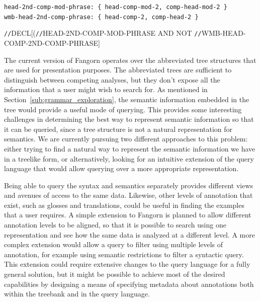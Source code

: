 \documentclass[12pt]{article}
\begin{document}
\begin{exe}
\ex\label{ex:gram}
{\small\tt head-2nd-comp-mod-phrase: \{ head-comp-mod-2, comp-head-mod-2 \}}\\
{\small\tt wmb-head-2nd-comp-phrase: \{ head-comp-2, comp-head-2 \}}
\end{exe}

\begin{exe}
\ex\label{ex:qry5}\small
\verb=//=DECL[(\verb=//=HEAD-2ND-COMP-MOD-PHRASE AND NOT \verb=//=WMB-HEAD-COMP-2ND-COMP-PHRASE]
\end{exe}

The current version of Fangorn operates over the abbreviated tree
structures that are used for presentation purposes. The abbreviated trees are
sufficient to distinguish between competing analyses, but they don't expose all
the information that a user might wish to search for. As mentioned in
Section~\ref{sub:grammar_exploration}, the semantic information embedded in the
tree would provide a useful mode of querying. This provides some interesting
challenges in determining the best way to represent semantic information so that
it can be queried, since a tree structure is not a natural representation for
semantics.  We are currently pursuing two different approaches to this problem:
either trying to find a natural way to represent the semantic information we
have in a treelike form, or alternatively, looking for an intuitive extension of
the query language that would allow querying over a more appropriate 
representation.

Being able to query the syntax and semantics separately provides different views
and avenues of access to the same data. Likewise, other levels of annotation
that exist, such as glosses and translations, could be useful in finding the
examples that a user requires. A simple extension to Fangorn is planned
to allow different annotation levels to be aligned, so that it is possible to
search using one representation and see how the same data is analyzed at a
different level. A more complex extension would allow a query to filter using
multiple levels of annotation, for example using semantic restrictions to filter
a syntactic query. This extension could require extensive changes to the query
language for a fully general solution, but it might be possible to achieve most
of the desired capabilities by designing a means of specifying metadata about
annotations both within the treebank and in the query language.
\end{document}
